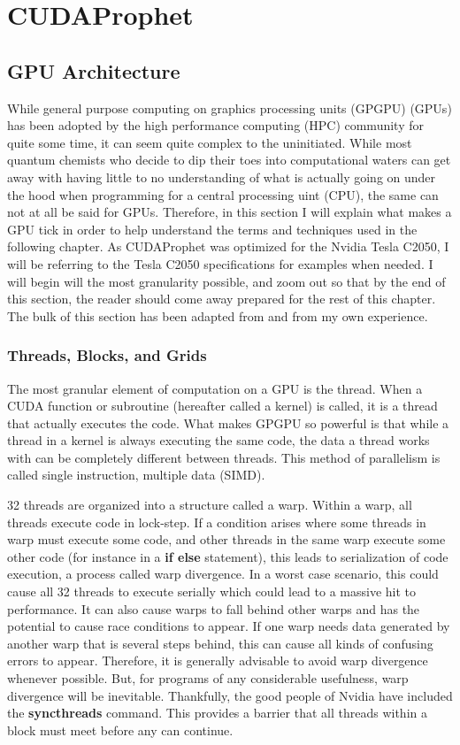 \documentclass[12pt]{report}
\newcommand{\comm}[1]{\textbf{#1}}
\begin{document}
\chapter{CUDAProphet}
\section{GPU Architecture}
While general purpose computing on graphics processing units (GPGPU) (GPUs) has been adopted by the high performance computing (HPC) community for quite some time, it can seem quite complex to the uninitiated. While most quantum chemists who decide to dip their toes into computational waters can get away with having little to no understanding of what is actually going on under the hood when programming for a central processing uint (CPU), the same can not at all be said for GPUs. Therefore, in this section I will explain what makes a GPU tick in order to help understand the terms and techniques used in the following chapter. As CUDAProphet was optimized for the Nvidia Tesla C2050, I will be referring to the Tesla C2050 specifications for examples when needed. I will begin will the most granularity possible, and zoom out so that by the end of this section, the reader should come away prepared for the rest of this chapter. The bulk of this section has been adapted from \cite{Ruetsch:2013:CFS:2588277, cudaFortran_pgi} and from my own experience.

\subsection{Threads, Blocks, and Grids}
\label{ThBlGr}
The most granular element of computation on a GPU is the thread. When a CUDA function or subroutine (hereafter called a kernel) is called, it is a thread that actually executes the code. What makes GPGPU so powerful is that while a thread in a kernel is always executing the same code, the data a thread works with can be completely different between threads. This method of parallelism is called single instruction, multiple data (SIMD). 

32 threads are organized into a structure called a warp. Within a warp, all threads execute code in lock-step. If a condition arises where some threads in warp must execute some code, and other threads in the same warp execute some other code (for instance in a \textbf{if else} statement), this leads to serialization of code execution, a process called warp divergence. In a worst case scenario, this could cause all 32 threads to execute serially which could lead to a massive hit to performance. It can also cause warps to fall behind other warps and has the potential to cause race conditions to appear. If one warp needs data generated by another warp that is several steps behind, this can cause all kinds of confusing errors to appear. Therefore, it is generally advisable to avoid warp divergence whenever possible. But, for programs of any considerable usefulness, warp divergence will be inevitable. Thankfully, the good people of Nvidia have included the \comm{syncthreads} command. This provides a barrier that all threads within a block must meet before any can continue. 
\end{document}
